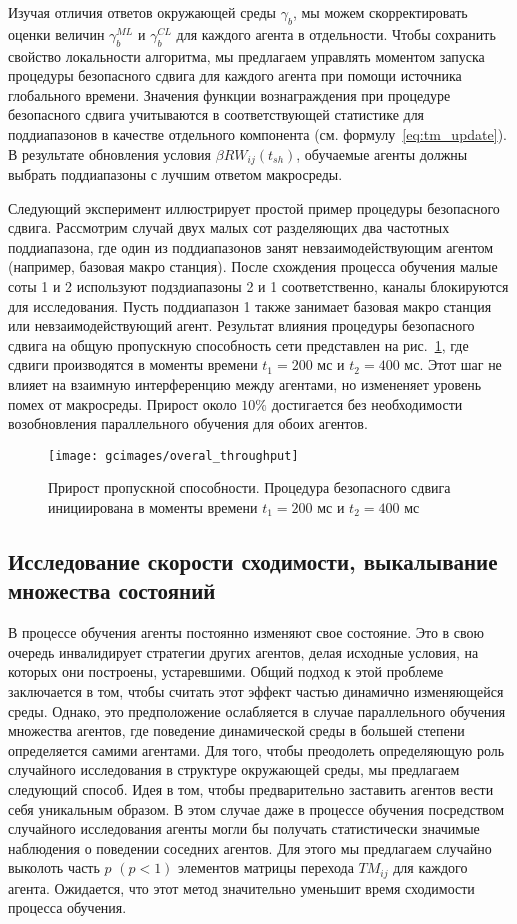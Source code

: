 Изучая отличия ответов окружающей среды $\gamma_b$, мы можем скорректировать оценки величин $\gamma_b^{ML}$ и $\gamma_b^{CL}$ для каждого агента в отдельности. Чтобы сохранить свойство локальности алгоритма, мы предлагаем управлять моментом запуска процедуры безопасного сдвига для каждого агента при помощи источника глобального времени. Значения функции вознаграждения при процедуре безопасного сдвига учитываются в соответствующей статистике для поддиапазонов в качестве отдельного компонента (см. формулу~\ref{eq:tm_update}). В результате обновления условия $\beta RW_{ij}(t_{sh})$, обучаемые агенты должны выбрать поддиапазоны с лучшим ответом макросреды.

Следующий эксперимент иллюстрирует простой пример процедуры безопасного сдвига. Рассмотрим случай двух малых сот разделяющих два частотных поддиапазона, где один из поддиапазонов занят невзаимодействующим агентом (например, базовая макро станция). После схождения процесса обучения малые соты 1 и 2 используют подздиапазоны 2 и 1 соответственно, каналы блокируются для исследования. Пусть поддиапазон 1 также занимает базовая макро станция или невзаимодействующий агент. Результат влияния процедуры безопасного сдвига на общую пропускную способность сети представлен на рис.~\ref{fig:safe_shift_overal_throughput}, где сдвиги производятся в моменты времени $t_1=200$ мс и $t_2=400$ мс. Этот шаг не влияет на взаимную интерференцию между агентами, но измененяет уровень помех от макросреды. Прирост около $10\%$ достигается без необходимости возобновления параллельного обучения для обоих агентов.

\begin{figure}[h!]
    \centering
    \texttt{[image: gcimages/overal\_throughput]}
    \caption{Прирост пропускной способности. Процедура безопасного сдвига инициирована в моменты времени $t_1=200$ мс и $t_2=400$ мс }
    \label{fig:safe_shift_overal_throughput}
\end{figure}

\subsection{Исследование скорости сходимости, выкалывание множества состояний}
В процессе обучения агенты постоянно изменяют свое состояние. Это в свою очередь инвалидирует стратегии других агентов, делая исходные условия, на которых они построены, устаревшими. Общий подход к этой проблеме заключается в том, чтобы считать этот эффект частью динамично изменяющейся среды. Однако, это предположение ослабляется в случае параллельного обучения множества агентов, где поведение динамической среды в большей степени определяется самими агентами.
Для того, чтобы преодолеть определяющую роль случайного исследования в структуре окружающей среды, мы предлагаем следующий способ. Идея в том, чтобы предварительно заставить агентов вести себя уникальным образом. В этом случае даже в процессе обучения посредством случайного исследования агенты могли бы получать статистически значимые наблюдения о поведении соседних агентов. Для этого мы предлагаем случайно выколоть часть $p$ $(p< 1)$ элементов матрицы перехода $TM_{ij}$ для каждого агента. Ожидается, что этот метод значительно уменьшит время сходимости процесса обучения.


